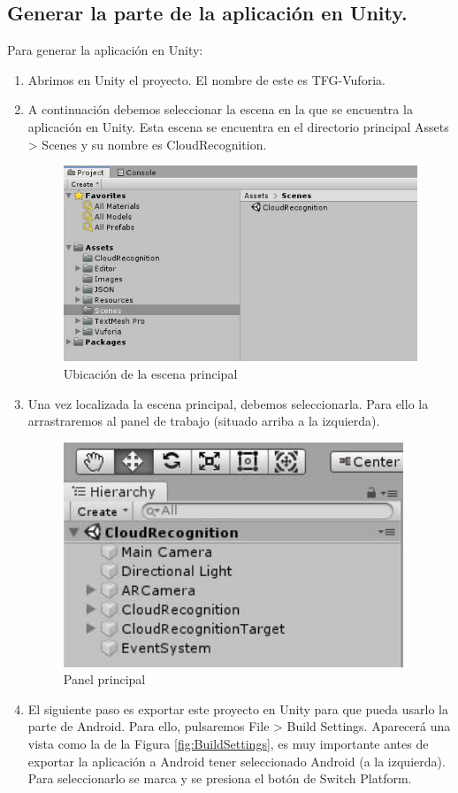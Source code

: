 \subsection{Generar la parte de la aplicación en Unity.}
Para generar la aplicación en Unity:
\begin{enumerate}
    \item Abrimos en Unity el proyecto. El nombre de este es TFG-Vuforia.
    \item A continuación debemos seleccionar la escena en la que se encuentra la aplicación en Unity. Esta escena se encuentra en 
    el directorio principal Assets > Scenes y su nombre es CloudRecognition.
    \begin{figure}[H]
        \centering
        \includegraphics[width=6in]{figures/Appendix-A/CapturaCloudRecognition.JPG}
        \caption{Ubicación de la escena principal}
        \label{fig:CloudRecognitionUbication1}
    \end{figure}
    \item Una vez localizada la escena principal, debemos seleccionarla. Para ello la arrastraremos al panel de trabajo (situado 
    arriba a la izquierda).
    \begin{figure}[H]
        \centering
        \includegraphics[width=4in]{figures/Appendix-A/CapturaPanel.JPG}
        \caption{Panel principal}
        \label{fig:CloudRecognitionUbication2}
    \end{figure}
    \item El siguiente paso es exportar este proyecto en Unity para que pueda usarlo la parte de Android. Para ello, pulsaremos 
    File > Build Settings. Aparecerá una vista como la de la Figura \ref{fig:BuildSettings}, es muy importante antes de exportar la 
    aplicación a Android tener seleccionado Android (a la izquierda). Para seleccionarlo se marca y se presiona el botón de Switch Platform.


\end{enumerate}
